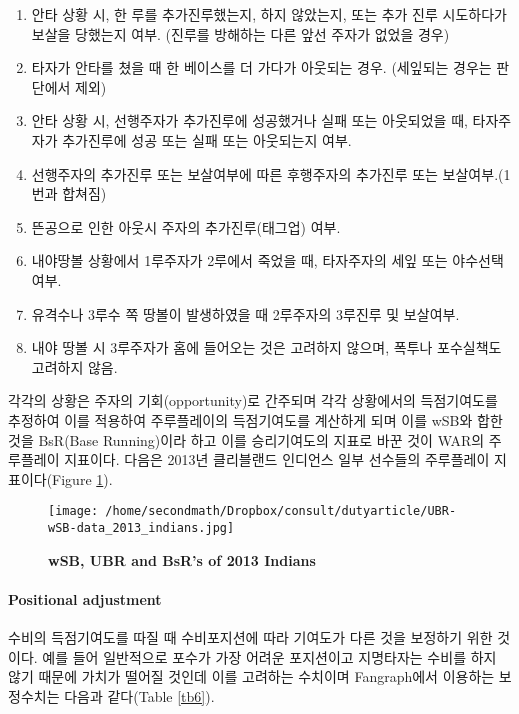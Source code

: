 \documentclass[11pt]{article}
\begin{document}
\begin{enumerate}
  \item  안타 상황 시, 한 루를 추가진루했는지, 하지 않았는지, 또는 추가 진루 시도하다가 보살을 당했는지 여부. (진루를 방해하는 다른 앞선 주자가 없었을 경우)
  \item 타자가 안타를 쳤을 때 한 베이스를 더 가다가 아웃되는 경우. (세잎되는 경우는 판단에서 제외)
  \item 안타 상황 시, 선행주자가 추가진루에 성공했거나 실패 또는 아웃되었을 때, 타자주자가 추가진루에 성공 또는 실패 또는 아웃되는지 여부.
  \item 선행주자의 추가진루 또는 보살여부에 따른 후행주자의 추가진루 또는 보살여부.(1번과 합쳐짐)
  \item 뜬공으로 인한 아웃시 주자의 추가진루(태그업) 여부.
  \item 내야땅볼 상황에서 1루주자가 2루에서 죽었을 때, 타자주자의 세잎 또는 야수선택 여부.
  \item 유격수나 3루수 쪽 땅볼이 발생하였을 때 2루주자의 3루진루 및 보살여부. 
  \item 내야 땅볼 시 3루주자가 홈에 들어오는 것은 고려하지 않으며, 폭투나 포수실책도 고려하지 않음. 
\end{enumerate}

각각의 상황은 주자의 기회(opportunity)로 간주되며 각각 상황에서의 득점기여도를 추정하여 이를 적용하여 주루플레이의 득점기여도를 계산하게 되며 이를 wSB와 합한 것을 BsR(Base Running)이라 하고 이를 승리기여도의 지표로 바꾼 것이 WAR의 주루플레이 지표이다. 다음은   2013년 클리블랜드 인디언스 일부 선수들의 주루플레이 지표이다\cite{UBRfig}(Figure \ref{fig5}).

\begin{figure}[!hbp]
\centering
\texttt{[image: /home/secondmath/Dropbox/consult/dutyarticle/UBR-wSB-data\_2013\_indians.jpg]}
\caption{\bf {wSB, UBR and BsR's of 2013 Indians}}
\label{fig5}
\end{figure}

\paragraph{Positional adjustment}
수비의 득점기여도를 따질 때 수비포지션에 따라 기여도가 다른 것을 보정하기 위한 것이다\cite{position_adjust}. 예를 들어 일반적으로 포수가 가장 어려운 포지션이고 지명타자는 수비를 하지 않기 때문에 가치가 떨어질 것인데 이를 고려하는 수치이며 Fangraph에서 이용하는 보정수치는 다음과 같다(Table \ref{tb6}).
\end{document}
